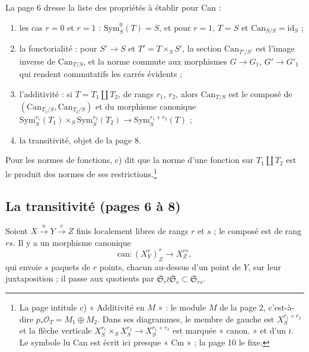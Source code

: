 \documentclass[11pt,a4paper]{article}
\begin{document}
La page 6 dresse la liste des propriétés à établir pour $\mathrm{Can}$ :
\begin{enumerate}
\item[a)] les cas $r = 0$ et $r = 1$ : $\mathrm{Sym}^{0}_{S}(T) = S$, et
pour $r = 1$, $T = S$ et $\mathrm{Can}_{S/S} = \mathrm{id}_S$ ;
\item[b)] la fonctorialité : pour $S' \to S$ et $T' = T \times_S S'$, la
section $\mathrm{Can}_{T'/S'}$ est l'image inverse de $\mathrm{Can}_{T/S}$, et
la norme commute aux morphismes $G \to G_1$, $G' \to G'_1$ qui rendent
commutatifs les carrés évidents ;
\item[c)] l'additivité : si $T = T_1 \amalg T_2$, de rangs $r_1$, $r_2$,
alors $\mathrm{Can}_{T/S}$ est le composé de
$(\mathrm{Can}_{T_1/S}, \mathrm{Can}_{T_2/S})$ et du morphisme canonique
$\mathrm{Sym}^{r_1}_{S}(T_1) \times_S \mathrm{Sym}^{r_2}_{S}(T_2) \to
\mathrm{Sym}^{r_1+r_2}_{S}(T)$ ;
\item[d)] la transitivité, objet de la page 8.
\end{enumerate}
Pour les normes de fonctions, c) dit que la norme d'une fonction sur
$T_1 \amalg T_2$ est le produit des normes de ses restrictions.\footnote{La
page intitule c) « Additivité en $M$ » : le module $M$ de la page 2,
c'est-à-dire $p_{*}\mathcal{O}_T = M_1 \oplus M_2$. Dans ses diagrammes, le
membre de gauche est $X^{r_1+r_2}_{S}$ et la flèche verticale
$X^{r_1}_{S} \times_S X^{r_2}_{S} \to X^{r_1+r_2}_{S}$ est marquée
« canon. » et d'un $\wr$. Le symbole lu $\mathrm{Can}$ est écrit ici presque
« Cm » ; la page 10 le fixe.}

\subsection*{La transitivité (pages 6 à 8)}

Soient $X \xrightarrow{u} Y \xrightarrow{v} Z$ finis localement libres de
rangs $r$ et $s$ ; le composé est de rang $rs$. Il y a un morphisme
canonique
\[
  \mathrm{can} : (X^{r}_{Y})^{s}_{Z} \longrightarrow X^{rs}_{Z},
\]
qui envoie $s$ paquets de $r$ points, chacun au-dessus d'un point de $Y$, sur
leur juxtaposition ; il passe aux quotients par
$\mathfrak{S}_r \wr \mathfrak{S}_s \subset \mathfrak{S}_{rs}$.
\end{document}

